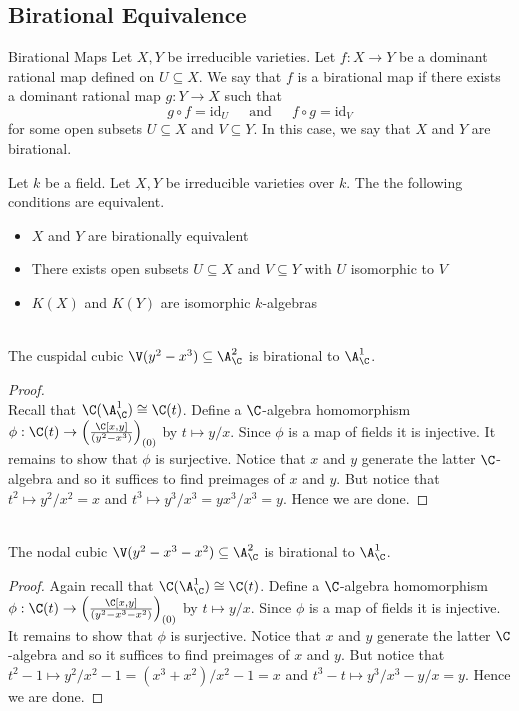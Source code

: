 \documentclass[a4paper]{article}
\begin{document}
\subsection{Birational Equivalence}
\begin{defn}{Birational Maps}{} Let $X,Y$ be irreducible varieties. Let $f:X\to Y$ be a dominant rational map defined on $U\subseteq X$. We say that $f$ is a birational map if there exists a dominant rational map $g:Y\to X$ such that $$g\circ f=\text{id}_U\;\;\;\;\text{ and }\;\;\;\;f\circ g=\text{id}_V$$ for some open subsets $U\subseteq X$ and $V\subseteq Y$. In this case, we say that $X$ and $Y$ are birational. 
\end{defn}

\begin{prp}{}{} Let $k$ be a field. Let $X,Y$ be irreducible varieties over $k$. The the following conditions are equivalent. 
\begin{itemize}
\item $X$ and $Y$ are birationally equivalent
\item There exists open subsets $U\subseteq X$ and $V\subseteq Y$ with $U$ isomorphic to $V$
\item $K(X)$ and $K(Y)$ are isomorphic $k$-algebras
\end{itemize}
\end{prp}

\begin{eg}{}{}\\
The cuspidal cubic $\V(y^2-x^3)\subseteq\A_\C^2$ is birational to $\A_\C^1$. 
\begin{proof}\\
Recall that $\C(\A_\C^1)\cong\C(t)$. Define a $\C$-algebra homomorphism $\phi:\C(t)\to\left(\frac{\C[x,y]}{(y^2-x^3)}\right)_{(0)}$ by $t\mapsto y/x$. Since $\phi$ is a map of fields it is injective. It remains to show that $\phi$ is surjective. Notice that $x$ and $y$ generate the latter $\C$-algebra and so it suffices to find preimages of $x$ and $y$. But notice that $t^2\mapsto y^2/x^2=x$ and $t^3\mapsto y^3/x^3=yx^3/x^3=y$. Hence we are done. 
\end{proof}
\end{eg}

\begin{eg}{}{}\\
The nodal cubic $\V(y^2-x^3-x^2)\subseteq\A_\C^2$ is birational to $\A_\C^1$. 
\begin{proof}
Again recall that $\C(\A_\C^1)\cong\C(t)$. Define a $\C$-algebra homomorphism $\phi:\C(t)\to\left(\frac{\C[x,y]}{(y^2-x^3-x^2)}\right)_{(0)}$ by $t\mapsto y/x$. Since $\phi$ is a map of fields it is injective. It remains to show that $\phi$ is surjective. Notice that $x$ and $y$ generate the latter $\C$-algebra and so it suffices to find preimages of $x$ and $y$. But notice that $t^2-1\mapsto y^2/x^2-1=(x^3+x^2)/x^2-1=x$ and $t^3-t\mapsto y^3/x^3-y/x=y$. Hence we are done. 
\end{proof}
\end{eg}
\end{document}
